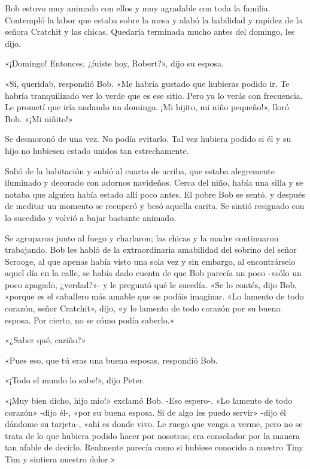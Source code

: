 \documentclass{novela}
\begin{document}
 Bob estuvo muy animado con ellos y muy agradable con toda la familia. Contempló la labor que estaba sobre la mesa y alabó la habilidad y rapidez de la señora Cratchit y las chicas. Quedaría terminada mucho antes del domingo, les dijo.

 «¡Domingo! Entonces, ¿fuiste hoy, Robert?», dijo su esposa.

 «Sí, queridab, respondió Bob. «Me habría gustado que hubieras podido ir. Te habría tranquilizado ver lo verde que es ese sitio. Pero ya lo verás con frecuencia. Le prometí que iría andando un domingo. ¡Mi hijito, mi niño pequeño!», lloró Bob. «¡Mi niñito!»

 Se desmoronó de una vez. No podía evitarlo. Tal vez hubiera podido si él y su hijo no hubiesen estado unidos tan estrechamente.

 Salió de la habitación y subió al cuarto de arriba, que estaba alegremente iluminado y decorado con adornos navideños. Cerca del niño, había una silla y se notaba que alguien había estado allí poco antes. El pobre Bob se sentó, y después de meditar un momento se recuperó y besó aquella carita. Se sintió resignado con lo sucedido y volvió a bajar bastante animado.

 Se agruparon junto al fuego y charlaron; las chicas y la madre continuaron trabajando. Bob les habló de la extraordinaria amabilidad del sobrino del señor Scrooge, al que apenas había visto una sola vez y sin embargo, al encontrárselo aquel día en la calle, se había dado cuenta de que Bob parecía un poco -«sólo un poco apagado, ¿verdad?»- y le preguntó qué le sucedía. «Se lo contés, dijo Bob, «porque es el caballero más amable que os podáis imaginar. «Lo lamento de todo corazón, señor Cratchit», dijo, «y lo lamento de todo corazón por su buena esposa. Por cierto, no se cómo podía saberlo.»

 «¿Saber qué, cariño?»

 «Pues eso, que tú eras una buena esposas, respondió Bob.

 «¡Todo el mundo lo sabe!», dijo Peter.

 «¡Muy bien dicho, hijo mio!» exclamó Bob. -Eso espero-. «Lo lamento de todo corazón» -dijo él-, «por su buena esposa. Si de algo les puedo servir» -dijo él dándome su tarjeta-, «ahí es donde vivo. Le ruego que venga a verme, pero no se trata de lo que hubiera podido hacer por nosotros; era consolador por la manera tan afable de decirlo. Realmente parecía como si hubiese conocido a nuestro Tiny Tim y sintiera nuestro dolor.»
\end{document}
